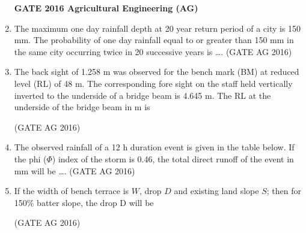 \documentclass[journal]{IEEEtran}
\begin{document}
\begin{enumerate}
\medskip

\noindent
\textbf{GATE 2016 Agricultural Engineering (AG)}

\item 
The maximum one day rainfall depth at 20 year return period of a city is 150 mm. The probability of one day rainfall equal to or greater than 150 mm in the same city occurring twice in 20 successive years is \dots.
\hfill(GATE AG 2016)\\

\medskip

\item 
The back sight of 1.258 m was observed for the bench mark (BM) at reduced level (RL) of 48 m. The corresponding fore sight on the staff held vertically inverted to the underside of a bridge beam is 4.645 m. The RL at the underside of the bridge beam in m is
\begin{enumerate}
\end{enumerate}
\hfill(GATE AG 2016)\\

\medskip

\item 
The observed rainfall of a 12 h duration event is given in the table below. If the phi ($\Phi$) index of the storm is 0.46, the total direct runoff of the event in mm will be \dots.
\hfill(GATE AG 2016)\\

\medskip



\medskip

\item 
If the width of bench terrace is $W$, drop $D$ and existing land slope $S$; then for 150\% batter slope, the drop D will be
\begin{enumerate}
\end{enumerate}
\hfill(GATE AG 2016)\\


\end{enumerate}
\end{document}
